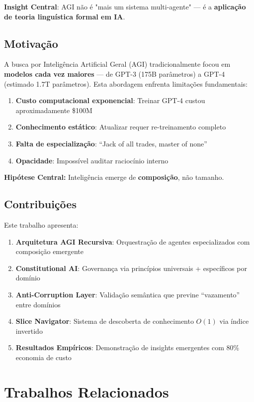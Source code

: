 \documentclass[11pt]{article}
\begin{document}
\textbf{Insight Central}: AGI não é "mais um sistema multi-agente" --- é a \textbf{aplicação de teoria linguística formal em IA}.

\subsection{Motivação}

A busca por Inteligência Artificial Geral (AGI) tradicionalmente focou em \textbf{modelos cada vez maiores} --- de GPT-3 (175B parâmetros) a GPT-4 (estimado 1.7T parâmetros). Esta abordagem enfrenta limitações fundamentais:

\begin{enumerate}
    \item \textbf{Custo computacional exponencial}: Treinar GPT-4 custou aproximadamente \$100M
    \item \textbf{Conhecimento estático}: Atualizar requer re-treinamento completo
    \item \textbf{Falta de especialização}: ``Jack of all trades, master of none''
    \item \textbf{Opacidade}: Impossível auditar raciocínio interno
\end{enumerate}

\textbf{Hipótese Central:} Inteligência emerge de \textbf{composição}, não tamanho.

\subsection{Contribuições}

Este trabalho apresenta:

\begin{enumerate}
    \item \textbf{Arquitetura AGI Recursiva}: Orquestração de agentes especializados com composição emergente
    \item \textbf{Constitutional AI}: Governança via princípios universais + específicos por domínio
    \item \textbf{Anti-Corruption Layer}: Validação semântica que previne ``vazamento'' entre domínios
    \item \textbf{Slice Navigator}: Sistema de descoberta de conhecimento $O(1)$ via índice invertido
    \item \textbf{Resultados Empíricos}: Demonstração de insights emergentes com 80\% economia de custo
\end{enumerate}

\section{Trabalhos Relacionados}
\end{document}
